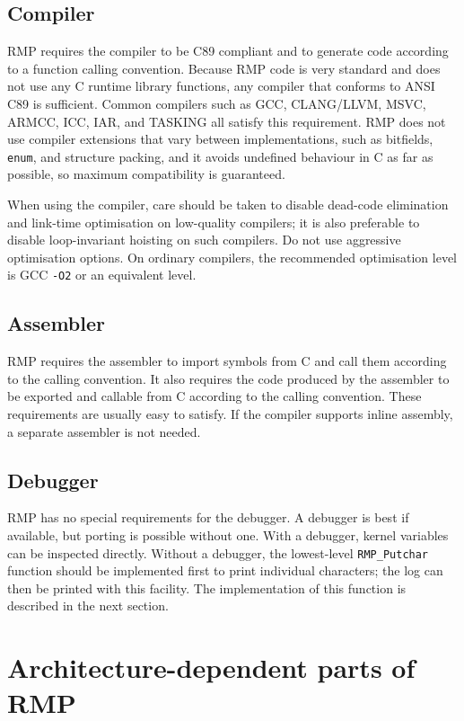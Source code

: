 \subsection{Compiler}

RMP requires the compiler to be C89 compliant and to generate code according to a function calling convention.
Because RMP code is very standard and does not use any C runtime library functions, any compiler that conforms to ANSI C89 is sufficient.
Common compilers such as GCC, CLANG/LLVM, MSVC, ARMCC, ICC, IAR, and TASKING all satisfy this requirement.
RMP does not use compiler extensions that vary between implementations, such as bitfields, \texttt{enum}, and structure packing, and it avoids undefined behaviour in C as far as possible, so maximum compatibility is guaranteed.

When using the compiler, care should be taken to disable dead-code elimination and link-time optimisation on low-quality compilers; it is also preferable to disable loop-invariant hoisting on such compilers.
Do not use aggressive optimisation options.
On ordinary compilers, the recommended optimisation level is GCC \texttt{-O2} or an equivalent level.

\subsection{Assembler}

RMP requires the assembler to import symbols from C and call them according to the calling convention.
It also requires the code produced by the assembler to be exported and callable from C according to the calling convention.
These requirements are usually easy to satisfy.
If the compiler supports inline assembly, a separate assembler is not needed.

\subsection{Debugger}

RMP has no special requirements for the debugger.
A debugger is best if available, but porting is possible without one.
With a debugger, kernel variables can be inspected directly.
Without a debugger, the lowest-level \texttt{RMP\_Putchar} function should be implemented first to print individual characters; the log can then be printed with this facility.
The implementation of this function is described in the next section.

\section{Architecture-dependent parts of RMP}

